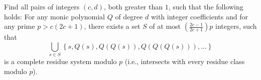 Find all pairs of integers $(c, d)$, both greater than $1$, such that the following holds:
For any monic polynomial $Q$ of degree $d$ with integer coefficients and
for any prime $p > c(2c+1)$, there exists a set $S$ of at most
$\left(\frac{2c-1}{2c+1}\right)p$ integers,
such that 
$$ \bigcup_{s\in S} \left\{s, Q(s), Q(Q(s)), Q(Q(Q(s))), \dots\right\}$$
is a complete residue system modulo $p$ (i.e., intersects with every residue
class modulo $p$).
